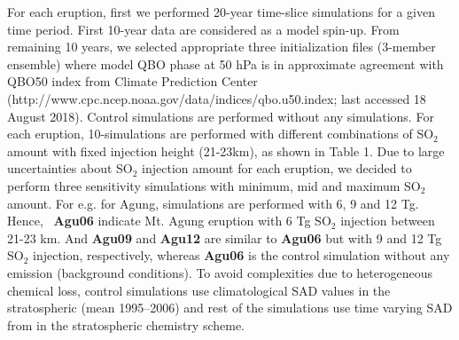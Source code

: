\documentclass[acpd]{copernicus}
\newcommand\agub{{\bf Agu06}\xspace}
\newcommand\aguc{{\bf Agu09}\xspace}
\newcommand\agud{{\bf Agu12}\xspace}
\begin{document}
For each eruption, first we performed 20-year time-slice simulations for a given 
time period. First 10-year data are considered as a model spin-up.  From remaining 
10 years, we selected appropriate three initialization files (3-member ensemble)
 where model QBO phase at 50 hPa is in approximate agreement with QBO50 index from
 Climate Prediction Center (http://www.cpc.ncep.noaa.gov/data/indices/qbo.u50.index; 
last accessed 18 August 2018). Control simulations are performed without any simulations.
 For each eruption, 10-simulations are performed with different combinations of SO$_2$ amount
with fixed injection height (21-23km), as shown in Table 1.   
Due to large uncertainties about SO$_2$ injection amount for each eruption, we decided to 
perform three sensitivity simulations with minimum, mid and maximum SO$_2$ amount. For e.g. 
for Agung, simulations are performed with 6, 9 and 12 Tg. 
Hence, ~\agub indicate Mt. Agung eruption with 6 Tg SO$_2$ injection 
between 21-23 km. And \aguc and \agud  are similar to \agub but
 with 9 and 12 Tg SO$_2$ injection, respectively, whereas \agub is the
control simulation without any  emission (background conditions). 
To avoid complexities due to heterogeneous 
chemical loss, control simulations use climatological SAD values in the
stratospheric (mean 1995--2006) and rest of the simulations use time varying SAD from 
\cite{Arfeuille2013} in the stratospheric chemistry scheme. 
\end{document}

